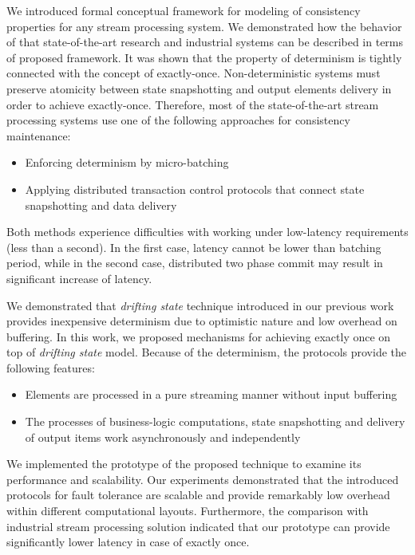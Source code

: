 
\label {fs-conclusion-seciton}

We introduced formal conceptual framework for modeling of consistency properties for any stream processing system. We demonstrated how the behavior of that state-of-the-art research and industrial systems can be described in terms of proposed framework. It was shown that the property of determinism is tightly connected with the concept of exactly-once. Non-deterministic systems must preserve atomicity between state snapshotting and output elements delivery in order to achieve exactly-once. Therefore, most of the state-of-the-art stream processing systems use one of the following approaches for consistency maintenance: 

\begin{itemize}
    \item Enforcing determinism by micro-batching
    \item Applying distributed transaction control protocols that connect state snapshotting and data delivery
\end{itemize}

Both methods experience difficulties with working under low-latency requirements (less than a second). In the first case, latency cannot be lower than batching period, while in the second case, distributed two phase commit may result in significant increase of latency.

We demonstrated that {\em drifting state} technique introduced in our previous work~\cite{we2018adbis} provides inexpensive determinism due to optimistic nature and low overhead on buffering. In this work, we proposed mechanisms for achieving exactly once on top of {\em drifting state} model. Because of the determinism, the protocols provide the following features:

\begin{itemize}
    \item Elements are processed in a pure streaming manner without input buffering
    \item The processes of business-logic computations, state snapshotting and delivery of output items work asynchronously and independently
\end{itemize}

We implemented the prototype of the proposed technique to examine its performance and scalability. Our experiments demonstrated that the introduced protocols for fault tolerance are scalable and provide remarkably low overhead within different computational layouts. Furthermore, the comparison with industrial stream processing solution indicated that our prototype can provide significantly lower latency in case of exactly once.